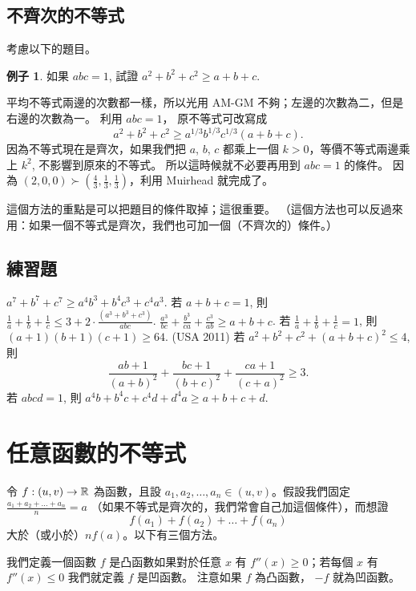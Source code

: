 \documentclass[11pt,nothm]{scrartcl}
\theoremstyle{definition}
\newtheorem{example}[theorem]{\color{blue!40!black}例子}
\let\oldendproof\endproof
\renewenvironment{proof}[1][【證】]{%
  \oldproof[\bfseries #1\nopunct]%
}{\oldendproof}
\begin{document}
\subsection{不齊次的不等式}
考慮以下的題目。
\begin{example}
  如果 $abc=1$, 試證 $a^2+b^2+c^2 \ge a+b+c$.
\end{example}
\begin{proof}
  平均不等式兩邊的次數都一樣，所以光用 AM-GM 不夠；左邊的次數為二，但是右邊的次數為一。
  利用 $abc=1$， 原不等式可改寫成
  \[ a^2+b^2+c^2 \ge a^{1/3}b^{1/3}c^{1/3} \left( a+b+c \right). \]
  因為不等式現在是齊次，如果我們把 $a$, $b$, $c$ 都乘上一個 $k>0$，等價不等式兩邊乘上 $k^2$, 不影響到原來的不等式。
  所以這時候就不必要再用到 $abc=1$ 的條件。
  因為 $(2,0,0) \succ (\frac 43, \frac 13, \frac 13)$，利用 Muirhead 就完成了。
\end{proof}

這個方法的重點是可以把題目的條件取掉；這很重要。
（這個方法也可以反過來用：如果一個不等式是齊次，我們也可加一個（不齊次的）條件。）

\subsection{練習題}
\begin{enumerate}
  \ii $a^7+b^7+c^7 \ge a^4b^3+b^4c^3+c^4a^3$.
  \ii 若 $a+b+c=1$, 則 $\frac1a + \frac 1b + \frac 1c \le 3 + 2 \cdot \frac{(a^3+b^3+c^3)}{abc}$.
  \ii $\frac{a^3}{bc} + \frac{b^3}{ca} + \frac{c^3}{ab} \ge a+b+c$.
  \ii 若 $\frac1a + \frac1b + \frac 1c =1$, 則 $(a+1)(b+1)(c+1) \ge 64$.
  \ii (USA 2011) 若 $a^2+b^2+c^2+(a+b+c)^2 \le 4$, 則
  \[ \frac{ab+1}{(a+b)^2} + \frac{bc+1}{(b+c)^2} + \frac{ca+1}{(c+a)^2} \ge 3. \]
  \ii 若 $abcd=1$, 則 $a^4b+b^4c+c^4d+d^4a \ge a+b+c+d$.
\end{enumerate}

\section{任意函數的不等式}
令 $f : (u,v) \to \mathbb R$ 為函數，且設 $a_1, a_2, \dots, a_n \in (u,v)$。假設我們固定 $\frac{a_1+a_2 + \dots + a_n}{n} = a$
（如果不等式是齊次的，我們常會自己加這個條件），而想證
\[ f(a_1) + f(a_2) + \dots + f(a_n) \]
大於（或小於）$nf(a)$。以下有三個方法。

我們定義一個函數 $f$ 是凸函數如果對於任意 $x$ 有 $f''(x) \ge 0$；若每個 $x$ 有 $f''(x) \le 0$ 我們就定義 $f$ 是凹函數。
注意如果 $f$ 為凸函數， $-f$ 就為凹函數。
\end{document}
